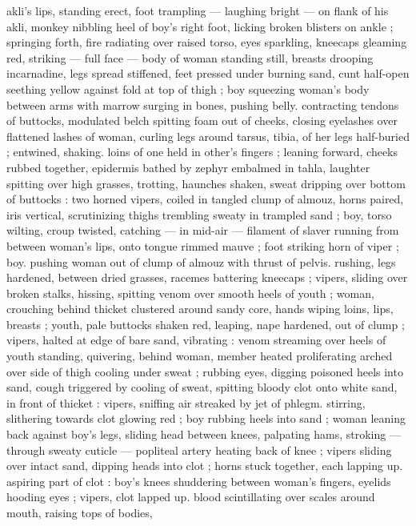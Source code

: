 akli's lips, standing erect, foot trampling --- laughing bright --- on
flank of his akli, monkey nibbling heel of boy's right foot, licking
broken blisters on ankle ; springing forth, fire radiating over raised
torso, eyes sparkling, kneecaps gleaming red, striking --- full face
--- body of woman standing still, breasts drooping incarnadine, legs
spread stiffened, feet pressed under burning sand, cunt half-open
seething yellow against fold at top of thigh ; boy squeezing woman's
body between arms with marrow surging in bones, pushing belly.
contracting tendons of buttocks, modulated belch spitting foam out
of cheeks, closing eyelashes over flattened lashes of woman, curling
legs around tarsus, tibia, of her legs half-buried ; entwined, shaking.
loins of one held in other's fingers ; leaning forward, cheeks rubbed
together, epidermis bathed by zephyr embalmed in tahla, laughter
spitting over high grasses, trotting, haunches shaken, sweat dripping
over bottom of buttocks : two horned vipers, coiled in tangled clump
of almouz, horns paired, iris vertical, scrutinizing thighs trembling
sweaty in trampled sand ; boy, torso wilting, croup twisted, catching
--- in mid-air --- filament of slaver running from between woman's
lips, onto tongue rimmed mauve ; foot striking horn of viper ; boy.
pushing woman out of clump of almouz with thrust of pelvis.
rushing, legs hardened, between dried grasses, racemes battering
kneecaps ; vipers, sliding over broken stalks, hissing, spitting venom
over smooth heels of youth ; woman, crouching behind thicket
clustered around sandy core, hands wiping loins, lips, breasts ;
youth, pale buttocks shaken red, leaping, nape hardened, out of
clump ; vipers, halted at edge of bare sand, vibrating : venom
streaming over heels of youth standing, quivering, behind woman,
member heated proliferating arched over side of thigh cooling under
sweat ; rubbing eyes, digging poisoned heels into sand, cough
triggered by cooling of sweat, spitting bloody clot onto white sand,
in front of thicket : vipers, sniffing air streaked by jet of phlegm.
stirring, slithering towards clot glowing red ; boy rubbing heels into
sand ; woman leaning back against boy's legs, sliding head between
knees, palpating hams, stroking --- through sweaty cuticle ---
popliteal artery heating back of knee ; vipers sliding over intact
sand, dipping heads into clot ; horns stuck together, each lapping up.
aspiring part of clot : boy's knees shuddering between woman's
fingers, eyelids hooding eyes ; vipers, clot lapped up. blood
scintillating over scales around mouth, raising tops of bodies,
